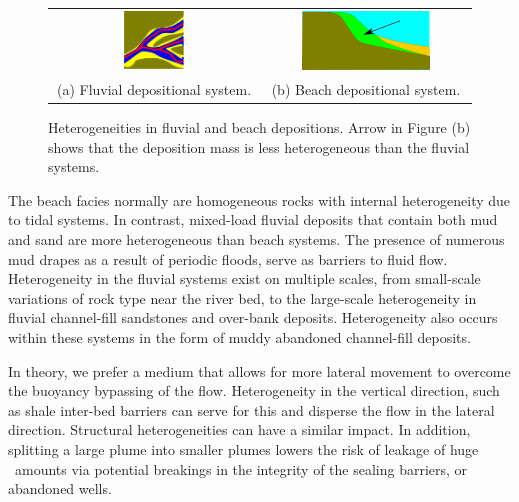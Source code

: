 \begin{figure}
\begin{tabular}{cc}
\includegraphics[width=0.3\textwidth]{./figurer/delta_fluvial}&
\includegraphics[width=0.65\textwidth]{./figurer/delta_beach}\\(a) Fluvial depositional system. &(b) Beach depositional system.
\end{tabular}
\caption{Heterogeneities in fluvial and beach depositions. Arrow in Figure (b) shows that the deposition mass is less heterogeneous than the fluvial systems.}
\label{fig:delta}
\end{figure}

The beach facies normally are homogeneous rocks with internal heterogeneity due to tidal systems. In contrast, mixed-load fluvial deposits that contain both mud and sand are more heterogeneous than beach systems. The presence of numerous mud drapes as a result of periodic floods, serve as barriers to fluid flow. Heterogeneity in the fluvial systems exist on multiple scales, from small-scale variations of rock type near the river bed, to the large-scale heterogeneity in fluvial channel-fill sandstones and over-bank deposits. Heterogeneity also occurs within these systems in the form of muddy abandoned channel-fill deposits.

In theory, we prefer a medium that allows for more lateral movement to overcome the buoyancy bypassing of the flow. Heterogeneity in the vertical direction, such as shale inter-bed barriers can serve for this and disperse the flow in the lateral direction. Structural heterogeneities can have a similar impact. In addition, splitting a large plume into smaller plumes lowers the risk of leakage of huge \coo\ amounts via potential breakings in the integrity of the sealing barriers, or abandoned wells.

